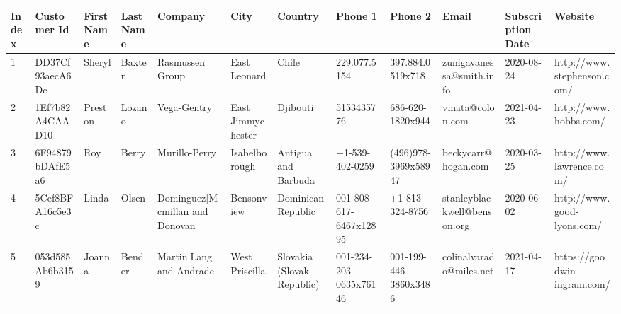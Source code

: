 \documentclass[11pt,a4paper]{article}
\begin{document}
\begin{table}[h]
\begin{tabular}{|l|l|l|l|l|l|l|l|l|l|l|l|}
\hline
Index & Customer Id & First Name & Last Name & Company & City & Country & Phone 1 & Phone 2 & Email & Subscription Date & Website \\ \hline
1 & DD37Cf93aecA6Dc & Sheryl & Baxter & Rasmussen Group & East Leonard & Chile & 229.077.5154 & 397.884.0519x718 & zunigavanessa@smith.info & 2020-08-24 & http://www.stephenson.com/ \\ \hline
2 & 1Ef7b82A4CAAD10 & Preston & Lozano & Vega-Gentry & East Jimmychester & Djibouti & 5153435776 & 686-620-1820x944 & vmata@colon.com & 2021-04-23 & http://www.hobbs.com/ \\ \hline
3 & 6F94879bDAfE5a6 & Roy & Berry & Murillo-Perry & Isabelborough & Antigua and Barbuda & +1-539-402-0259 & (496)978-3969x58947 & beckycarr@hogan.com & 2020-03-25 & http://www.lawrence.com/ \\ \hline
4 & 5Cef8BFA16c5e3c & Linda & Olsen & Dominguez|Mcmillan and Donovan & Bensonview & Dominican Republic & 001-808-617-6467x12895 & +1-813-324-8756 & stanleyblackwell@benson.org & 2020-06-02 & http://www.good-lyons.com/ \\ \hline
5 & 053d585Ab6b3159 & Joanna & Bender & Martin|Lang and Andrade & West Priscilla & Slovakia (Slovak Republic) & 001-234-203-0635x76146 & 001-199-446-3860x3486 & colinalvarado@miles.net & 2021-04-17 & https://goodwin-ingram.com/ \\ \hline
\end{tabular}
\end{table}
\end{document}
